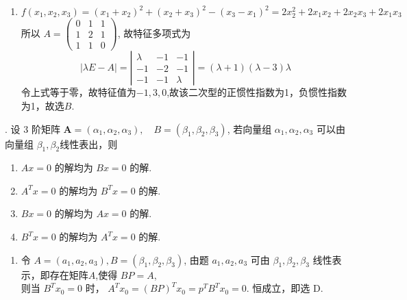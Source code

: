 \documentclass{article}
\begin{document}
\begin{enumerate}[\qquad 解：]
    \item $f\left(x_{1}, x_{2}, x_{3}\right)=\left(x_{1}+x_{2}\right)^{2}+\left(x_{2}+x_{3}\right)^{2}-\left(x_{3}-x_{1}\right)^{2}=2 x_{2}^{2}+2 x_{1} x_{2}+2 x_{2} x_{3}+2 x_{1} x_{3}$  \\
          所以 $A=\left(\begin{array}{ccc}
                      0 & 1 & 1 \\
                      1 & 2 & 1 \\
                      1 & 1 & 0
                  \end{array}\right)$, 故特征多项式为
          \begin{equation*}
              |\lambda E-A|=\left|\begin{array}{rrr}
                  \lambda & -1 & -1      \\
                  -1      & -2 & -1      \\
                  -1      & -1 & \lambda
              \end{array}\right|=(\lambda+1)(\lambda-3) \lambda
          \end{equation*}
          令上式等于零，故特征值为$-1,3,0$,故该二次型的正惯性指数为1，负惯性指数为1，故选$B$.
\end{enumerate}

\vspace{1ex}
{.} 设 3 阶矩阵 $\boldsymbol{A}=\left(\alpha_{1}, \alpha_{2}, \alpha_{3}\right), \quad B=\left(\beta_{1}, \beta_{2}, \beta_{3}\right)$, 若向量组 $\alpha_{1}, \alpha_{2}, \alpha_{3}$ 可以由向量组 $\beta_{1}, \beta_{2}$线性表出，则
\begin{enumerate}
    \item $A x=0$ 的解均为 $B x=0$ 的解.
    \item $A^{T} x=0$ 的解均为 $B^{T} x=0$ 的解.
    \item $B x=0$ 的解均为 $A x=0$ 的解.
    \item $B^{T} x=0$ 的解均为 $A^{T} x=0$ 的解.
\end{enumerate}

\begin{enumerate}[\qquad 解：]
    \item 令 $A=\left(a_{1}, a_{2}, a_{3}\right), B=\left(\beta_{1}, \beta_{2}, \beta_{3}\right)$, 由题 $a_{1}, a_{2}, a_{3}$ 可由 $\beta_{1}, \beta_{2}, \beta_{3}$ 线性表示，即存在矩阵$A$,使得 $B P=A$, \\
          则当 $B^{T} x_{0}=0$ 时， $A^{T} x_{0}=(B P)^{T} x_{0}=p^{T} B^{T} x_{0}=0 .$ 恒成立，即选 $\mathrm{D}$.
\end{enumerate}
\end{document}
